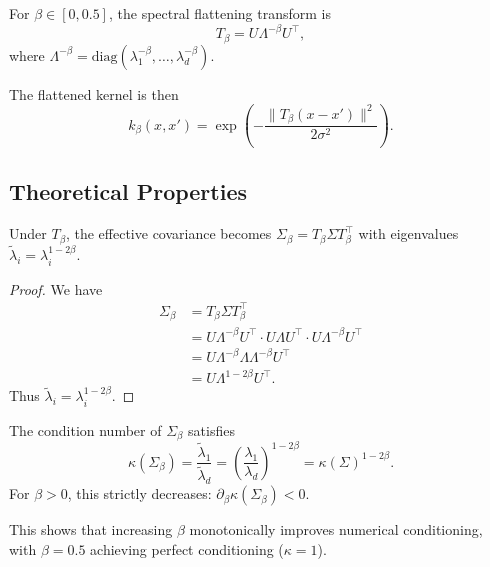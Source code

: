 \documentclass[11pt]{article}
\begin{document}
\begin{definition}
For $\beta \in [0, 0.5]$, the spectral flattening transform is
\begin{equation}
    T_\beta = U \Lambda^{-\beta} U^\top,
\end{equation}
where $\Lambda^{-\beta} = \text{diag}(\lambda_1^{-\beta}, \ldots, \lambda_d^{-\beta})$.
\end{definition}

The flattened kernel is then
\begin{equation}
    k_\beta(x, x') = \exp\left(-\frac{\|T_\beta(x - x')\|^2}{2\sigma^2}\right).
\end{equation}

\subsection{Theoretical Properties}

\begin{proposition}
Under $T_\beta$, the effective covariance becomes $\Sigma_\beta = T_\beta \Sigma T_\beta^\top$ with eigenvalues $\tilde{\lambda}_i = \lambda_i^{1-2\beta}$.
\end{proposition}

\begin{proof}
We have
\begin{align}
    \Sigma_\beta &= T_\beta \Sigma T_\beta^\top \\
    &= U \Lambda^{-\beta} U^\top \cdot U \Lambda U^\top \cdot U \Lambda^{-\beta} U^\top \\
    &= U \Lambda^{-\beta} \Lambda \Lambda^{-\beta} U^\top \\
    &= U \Lambda^{1-2\beta} U^\top.
\end{align}
Thus $\tilde{\lambda}_i = \lambda_i^{1-2\beta}$.
\end{proof}

\begin{proposition}
The condition number of $\Sigma_\beta$ satisfies
\begin{equation}
    \kappa(\Sigma_\beta) = \frac{\tilde{\lambda}_1}{\tilde{\lambda}_d} = \left(\frac{\lambda_1}{\lambda_d}\right)^{1-2\beta} = \kappa(\Sigma)^{1-2\beta}.
\end{equation}
For $\beta > 0$, this strictly decreases: $\partial_\beta \kappa(\Sigma_\beta) < 0$.
\end{proposition}

This shows that increasing $\beta$ monotonically improves numerical conditioning, with $\beta=0.5$ achieving perfect conditioning ($\kappa=1$).
\end{document}
